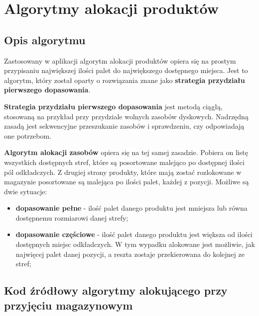 \chapter{Algorytmy alokacji produktów}
\label{ca:allocationAlgorithms}

	\section{Opis algorytmu}
		Zastosowany w aplikacji algorytm alokacji produktów opiera się na prostym 
		przypisaniu największej ilości palet do największego dostępnego miejsca. 
		Jest to algorytm, który został oparty o rozwiązania znane jako 
		\textbf{strategia przydziału pierwszego dopasowania}.
		
		\textbf{Strategia przydziału pierwszego dopasowania} jest metodą ciągłą,
		stosowaną na przykład przy przydziale wolnych zasobów dyskowych. Nadrzędną zasadą
		jest sekwencyjne przeszukanie zasobów i sprawdzeniu, czy odpowiadają one 
		potrzebom.
		
		\textbf{Algorytm alokacji zasobów} opiera się na tej samej zasadzie. Pobiera
		on listę wszystkich dostępnych stref, które są posortowane malejąco po dostępnej
		ilości pól odkładczych. Z drugiej strony produkty, które mają zostać
		rozlokowane w magazynie posortowane są malejąca po ilości palet, każdej z pozycji.
		Możliwe są dwie sytuacje:
		\begin{itemize}
			\item \textbf{dopasowanie pełne} - ilość palet danego produktu jest mniejsza lub
			równa dostępnemu rozmiarowi danej strefy;
			\item \textbf{dopasowanie częściowe} - ilość palet danego produktu jest większa od ilości
			dostępnych miejsc odkładczych. W tym wypadku alokowane jest możliwie, jak najwięcej palet
			danej pozycji, a reszta zostaje przekierowana do kolejnej ze stref;
		\end{itemize}

	\section{Kod źródłowy algorytmy alokującego przy przyjęciu magazynowym}
